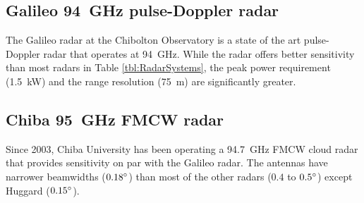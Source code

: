 \documentclass{article}
\begin{document}
\subsection{Galileo \SI{94}{\giga\hertz} pulse-Doppler radar}
The Galileo radar\supercite{Galileo} at the Chibolton Observatory is a state of the art pulse-Doppler radar that operates at \SI{94}{\giga\hertz}. While the radar offers better sensitivity than most radars in Table \ref{tbl:RadarSystems}, the peak power requirement (\SI{1.5}{\kilo\watt}) and the range resolution (\SI{75}{\metre}) are significantly greater.

\subsection{Chiba \SI{95}{\giga\hertz} FMCW radar}
Since 2003, Chiba University has been operating a \SI{94.7}{\giga\hertz} FMCW cloud radar\supercite{Chiba} that provides sensitivity on par with the Galileo radar. The antennas have narrower beamwidths (\(0.18\degree\)) than most of the other radars (\(0.4\) to \(0.5\degree\)) except Huggard (\(0.15\degree\)).
\end{document}
